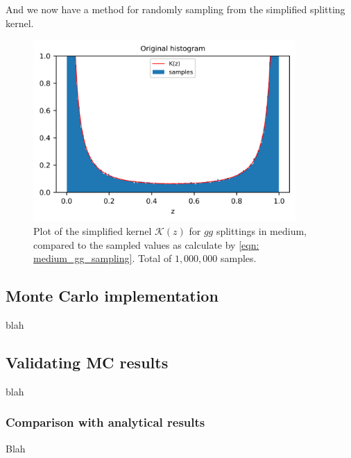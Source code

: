 \documentclass[main.tex]{subfiles}
\begin{document}
And we now have a method for randomly sampling from the simplified splitting kernel. 
\begin{figure}[ht]
    \centering
    \includegraphics[width=10cm]{pictures/splitting_functions/medium_gg_samples.png}
    \caption{Plot of the simplified kernel \(\mathcal{K}(z)\) for \(gg\) splittings in medium, compared to the sampled values as calculate by \autoref{eqn: medium_gg_sampling}. Total of  \(1,000,000\) samples.}
    \label{fig: medium_gg_sampling}
\end{figure}

\subsection{Monte Carlo implementation}
blah
\subsection{Validating MC results}
blah
\subsubsection{Comparison with analytical results}
Blah
\end{document}
